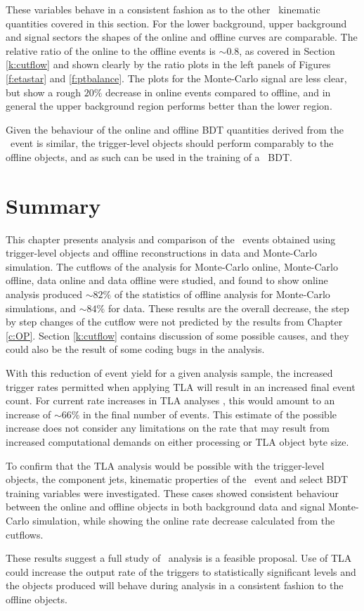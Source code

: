     These variables behave in a consistent fashion as to the other \VBFHBB\ kinematic quantities covered in this section. For the lower background, upper background and signal sectors the shapes of the online and offline curves are comparable. The relative ratio of the online to the offline events is $\sim0.8$, as covered in Section \ref{k:cutflow} and shown clearly by the ratio plots in the left panels of Figures \ref{f:etastar} and \ref{f:ptbalance}. The plots for the Monte-Carlo signal are less clear, but show a rough $20\%$ decrease in online events compared to offline, and in general the upper background region performs better than the lower region.

    Given the behaviour of the online and offline BDT quantities derived from the \VBFHBB\ event is similar, the trigger-level objects should perform comparably to the offline objects, and as such can be used in the training of a \VBFHBB\ BDT.
    \section{Summary}

    This chapter presents analysis and comparison of the \VBFHBB\ events obtained using trigger-level objects and offline reconstructions in data and Monte-Carlo simulation. The cutflows of the analysis for Monte-Carlo online, Monte-Carlo offline, data online and data offline were studied, and found to show online analysis produced $\sim82\%$ of the statistics of offline analysis for Monte-Carlo simulations, and $\sim84\%$ for data. These results are the overall decrease, the step by step changes of the cutflow were not predicted by the results from Chapter \ref{c:OP}. Section \ref{k:cutflow} contains discussion of some possible causes, and they could also be the result of some coding bugs in the analysis.

    With this reduction of event yield for a given analysis sample, the increased trigger rates permitted when applying TLA will result in an increased final event count. For current rate increases in TLA analyses \cite{tla}, this would amount to an increase of $\sim66\%$ in the final number of events. This estimate of the possible increase does not consider any limitations on the rate that may result from increased computational demands on either processing or TLA object byte size.

    To confirm that the TLA analysis would be possible with the trigger-level objects, the component jets, kinematic properties of the \VBFHBB\ event and select BDT training variables were investigated. These cases showed consistent behaviour between the online and offline objects in both background data and signal Monte-Carlo simulation, while showing the online rate decrease calculated from the cutflows.

    These results suggest a full study of \VBFHBB\ analysis is a feasible proposal. Use of TLA could increase the output rate of the triggers to statistically significant levels and the objects produced will behave during analysis in a consistent fashion to the offline objects.
\endinput
